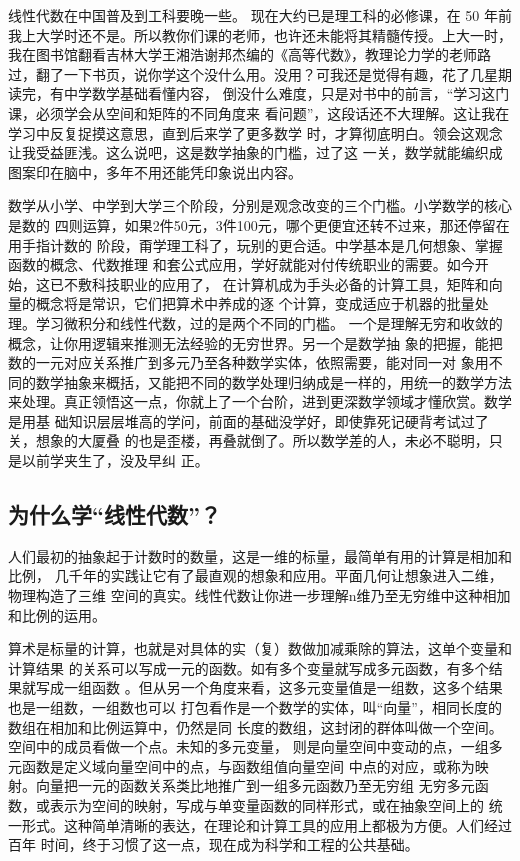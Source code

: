 线性代数在中国普及到工科要晚一些。 现在大约已是理工科的必修课，在 50 年前我上大学时还不是。所以教你们课的老师，也许还未能将其精髓传授。上大一时，我在图书馆翻看吉林大学王湘浩谢邦杰编的《高等代数》，教理论力学的老师路过，翻了一下书页，说你学这个没什么用。没用？可我还是觉得有趣，花了几星期读完，有中学数学基础看懂内容，
倒没什么难度，只是对书中的前言，“学习这门课，必须学会从空间和矩阵的不同角度来
看问题”，这段话还不大理解。这让我在学习中反复捉摸这意思，直到后来学了更多数学
时，才算彻底明白。领会这观念让我受益匪浅。这么说吧，这是数学抽象的门槛，过了这
一关，数学就能编织成图案印在脑中，多年不用还能凭印象说出内容。

数学从小学、中学到大学三个阶段，分别是观念改变的三个门槛。小学数学的核心是数的
四则运算，如果2件50元，3件100元，哪个更便宜还转不过来，那还停留在用手指计数的
阶段，甭学理工科了，玩别的更合适。中学基本是几何想象、掌握函数的概念、代数推理
和套公式应用，学好就能对付传统职业的需要。如今开始，这已不敷科技职业的应用了，
在计算机成为手头必备的计算工具，矩阵和向量的概念将是常识，它们把算术中养成的逐
个计算，变成适应于机器的批量处理。学习微积分和线性代数，过的是两个不同的门槛。
一个是理解无穷和收敛的概念，让你用逻辑来推测无法经验的无穷世界。另一个是数学抽
象的把握，能把数的一元对应关系推广到多元乃至各种数学实体，依照需要，能对同一对
象用不同的数学抽象来概括，又能把不同的数学处理归纳成是一样的，用统一的数学方法
来处理。真正领悟这一点，你就上了一个台阶，进到更深数学领域才懂欣赏。数学是用基
础知识层层堆高的学问，前面的基础没学好，即使靠死记硬背考试过了关，想象的大厦叠
的也是歪楼，再叠就倒了。所以数学差的人，未必不聪明，只是以前学夹生了，没及早纠
正。

\subsection{为什么学“线性代数”？}
人们最初的抽象起于计数时的数量，这是一维的标量，最简单有用的计算是相加和比例，
几千年的实践让它有了最直观的想象和应用。平面几何让想象进入二维，物理构造了三维
空间的真实。线性代数让你进一步理解n维乃至无穷维中这种相加和比例的运用。

算术是标量的计算，也就是对具体的实（复）数做加减乘除的算法，这单个变量和计算结果
的关系可以写成一元的函数。如有多个变量就写成多元函数，有多个结果就写成一组函数
。但从另一个角度来看，这多元变量值是一组数，这多个结果也是一组数，一组数也可以
打包看作是一个数学的实体，叫“向量”，相同长度的数组在相加和比例运算中，仍然是同
长度的数组，这封闭的群体叫做一个空间。空间中的成员看做一个点。未知的多元变量，
则是向量空间中变动的点，一组多元函数是定义域向量空间中的点，与函数组值向量空间
中点的对应，或称为映射。向量把一元的函数关系类比地推广到一组多元函数乃至无穷组
无穷多元函数，或表示为空间的映射，写成与单变量函数的同样形式，或在抽象空间上的
统一形式。这种简单清晰的表达，在理论和计算工具的应用上都极为方便。人们经过百年
时间，终于习惯了这一点，现在成为科学和工程的公共基础。

